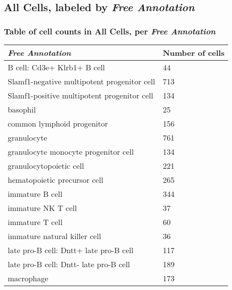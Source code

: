 \clearpage

\subsection{All Cells, labeled by \emph{Free Annotation}}
\subsubsection{Table of cell counts in All Cells, per \emph{Free Annotation}}\begin{table}[h]
\centering
\label{my-label}
\begin{tabular}{@{}ll@{}}
\toprule

\emph{Free Annotation}& Number of cells \\ \midrule
B cell: Cd3e+ Klrb1+ B cell & 44 \\

Slamf1-negative multipotent progenitor cell & 713 \\

Slamf1-positive multipotent progenitor cell & 134 \\

basophil & 25 \\

common lymphoid progenitor & 156 \\

granulocyte & 761 \\

granulocyte monocyte progenitor cell & 134 \\

granulocytopoietic cell & 221 \\

hematopoietic precursor cell & 265 \\

immature B cell & 344 \\

immature NK T cell & 37 \\

immature T cell & 60 \\

immature natural killer cell & 36 \\

late pro-B cell: Dntt+ late pro-B cell & 117 \\

late pro-B cell: Dntt- late pro-B cell & 189 \\

macrophage & 173 \\


\end{tabular}
\end{table}
